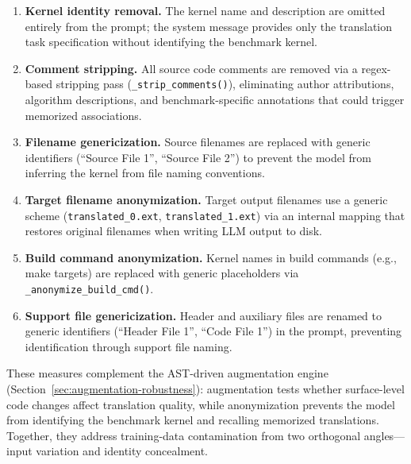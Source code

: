 \documentclass[conference]{IEEEtran}
\begin{document}
\begin{enumerate}
  \item \textbf{Kernel identity removal.} The kernel name and description are omitted entirely from the prompt; the system message provides only the translation task specification without identifying the benchmark kernel. %
  \item \textbf{Comment stripping.} All source code comments are removed via a regex-based stripping pass (\texttt{\_strip\_comments()}), eliminating author attributions, algorithm descriptions, and benchmark-specific annotations that could trigger memorized associations. %
  \item \textbf{Filename genericization.} Source filenames are replaced with generic identifiers (``Source File 1'', ``Source File 2'') to prevent the model from inferring the kernel from file naming conventions. %
  \item \textbf{Target filename anonymization.} Target output filenames use a generic scheme (\texttt{translated\_0.ext}, \texttt{translated\_1.ext}) via an internal mapping that restores original filenames when writing LLM output to disk. %
  \item \textbf{Build command anonymization.} Kernel names in build commands (e.g., make targets) are replaced with generic placeholders via \texttt{\_anonymize\_build\_cmd()}. %
  \item \textbf{Support file genericization.} Header and auxiliary files are renamed to generic identifiers (``Header File 1'', ``Code File 1'') in the prompt, preventing identification through support file naming. %
\end{enumerate}

These measures complement the AST-driven augmentation engine (Section~\ref{sec:augmentation-robustness}): augmentation tests whether surface-level code changes affect translation quality, while anonymization prevents the model from identifying the benchmark kernel and recalling memorized translations. Together, they address training-data contamination from two orthogonal angles---input variation and identity concealment.
\end{document}
